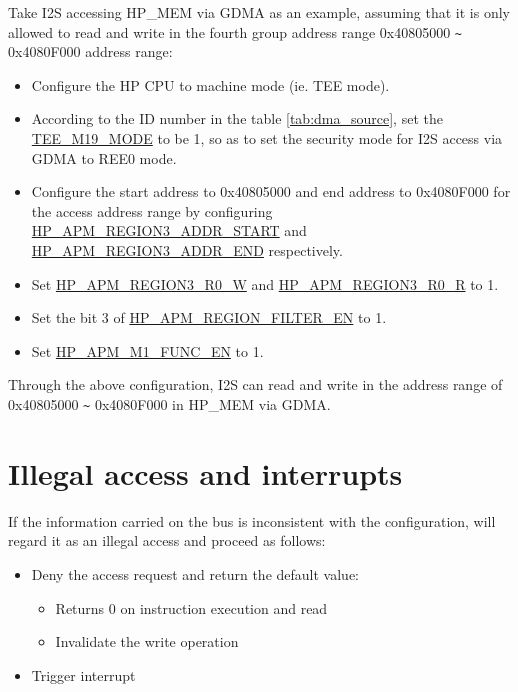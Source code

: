 \documentclass[main\_\_EN.tex]{subfiles}
\begin{document}
Take I2S accessing HP\_MEM via GDMA as an example, assuming that it is only allowed to read and write in the fourth group address range 0x40805000 \verb+~+  0x4080F000 address range:


\begin{itemize}

    \item Configure the HP CPU to machine mode (ie. TEE mode).
    
    \item According to the ID number in the table \ref{tab:dma_source}, set the \hyperref[fielddesc:TEEM0MODE]{TEE\_M19\_MODE} to be 1, so as to set the security mode for I2S access via GDMA to REE0 mode.
    
    \item Configure the start address to 0x40805000 and end address to 0x4080F000 for the access address range by configuring  \hyperref[regdesc:HPAPMREGION0ADDRSTARTREG]{HP\_APM\_REGION3\_ADDR\_START} and \hyperref[regdesc:HPAPMREGION0ADDRSTARTREG]{HP\_APM\_REGION3\_ADDR\_END} respectively.
    
    \item Set \hyperref[fielddesc:HPAPMREGION0R0W]{HP\_APM\_REGION3\_R0\_W} and  \hyperref[fielddesc:HPAPMREGION0R0R]{HP\_APM\_REGION3\_R0\_R} to 1.
    
    \item Set the bit 3 of \hyperref[fielddesc:HPAPMREGIONFILTEREN]{HP\_APM\_REGION\_FILTER\_EN} to 1.
    
    \item Set \hyperref[fielddesc:HPAPMM1FUNCEN]{HP\_APM\_M1\_FUNC\_EN} to 1.

\end{itemize}

Through the above configuration, I2S can read and write in the address range of 0x40805000 \verb+~+  0x4080F000 in HP\_MEM via GDMA.

\section{Illegal access and interrupts}

If the information carried on the bus is inconsistent with the configuration, \chipname{} will regard it as an illegal access and proceed as follows:

\begin{itemize}
    \item Deny the access request and return the default value:
    \begin{itemize}
        \item Returns 0 on instruction execution and read
        \item Invalidate the write operation
    \end{itemize}
    \item Trigger interrupt
\end{itemize}
\end{document}
